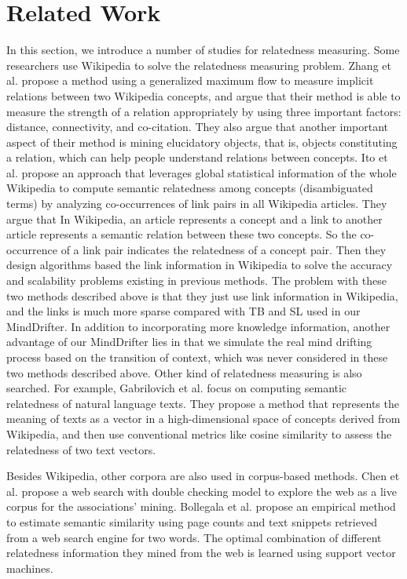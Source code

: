 \section{Related Work}
\label{sec:related}
In this section, we introduce a number of studies for relatedness measuring.
Some researchers use Wikipedia to solve the relatedness measuring problem.
\cite{ZhangX:2010,Ito:2008,Gabrilovich:2007}
Zhang et al. \cite{ZhangX:2010}propose a method using a generalized maximum flow
to measure implicit relations between two Wikipedia concepts, and argue that 
their method is able to measure the strength of a relation appropriately by using 
three important factors: distance, connectivity, and co-citation.
They also argue that another important aspect of their method 
is mining elucidatory objects, that is, objects constituting a relation, 
which can help people understand relations between concepts.
Ito et al. \cite{Ito:2008}propose an approach that leverages global statistical information of the whole Wikipedia to compute semantic relatedness among concepts (disambiguated terms) by analyzing co-occurrences of link pairs in all Wikipedia articles. They argue that In Wikipedia, an article represents a concept and a link to another article represents a semantic relation between these two concepts. So the co-occurrence of a link pair indicates the relatedness of a concept pair. Then they design algorithms based the link information in Wikipedia to solve the accuracy and
scalability problems existing in previous methods.
The problem with these two methods described above is that they just use link information in Wikipedia, and the links is much more sparse compared with TB and SL used in our MindDrifter. In addition to incorporating more knowledge information, another advantage of our MindDrifter lies in that we simulate the real mind drifting process based on the transition of context, which was never considered in these two methods described above.
Other kind of relatedness measuring is also searched. For example, Gabrilovich et al. \cite{Gabrilovich:2007} focus on computing semantic relatedness
of natural language texts. They propose a method that represents the meaning
of texts as a vector in a high-dimensional space of concepts derived from Wikipedia,
and then use conventional metrics like cosine similarity to 
assess the relatedness of two text vectors.

Besides Wikipedia, other corpora are also used in corpus-based methods.\cite{Chen:2006,Bollegala:2011}
Chen et al. \cite{Chen:2006} propose a web search with double checking
model to explore the web as a live corpus for the associations' mining. 
Bollegala et al. \cite{Bollegala:2011}propose an empirical method to estimate semantic similarity using page counts and text snippets retrieved from a web search
engine for two words. The optimal combination of different relatedness information they mined from the web is learned using support vector machines.

